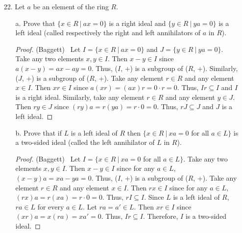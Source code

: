 \documentclass[10pt]{article}
\begin{document}
\begin{itemize}
\begin{itemize}
\item[b.] Prove that the intersection of an arbitrary nonempty collection of ideals is again an ideal
(do not assume the collection is countable).
\begin{proof} (Baggett) \ Let $\{ I_\lambda \}_{\lambda \in \Lambda}$ be an arbitrary nonempty collection
of ideals of a ring $R$. From Exercise 2.1.10(b), ($\bigcap_{\lambda \in \Lambda} I_\lambda$, +) is a subgroup 
of ($R$, +) since for every $\lambda \in \Lambda$, ($I_\lambda$, +) is a subgroup of ($R$, +). Take any element
$k \in \bigcap_{\lambda \in \Lambda} I_\lambda$. Then $k \in I_\lambda$ for every $\lambda \in \Lambda$. Since
$I_\lambda$ is an ideal, $rk \in I_\lambda$ for every $\lambda \in \Lambda$. Thus, 
$rk \in \bigcap_{\lambda \in \Lambda} I_\lambda$. Hence, $\bigcap_{\lambda \in \Lambda} I_\lambda$ is closed
under left multiplication by elements of $R$. Similarly, $\bigcap_{\lambda \in \Lambda} I_\lambda$ is closed
under right multiplication by elements of $R$. Thus, $\bigcap_{\lambda \in \Lambda} I_\lambda$ is an ideal of $R$.
\end{proof}
\end{itemize}


\item[22.] Let $a$ be an element of the ring $R$.
\begin{itemize}
\item[a.] Prove that $\{x \in R \ | \ ax = 0\}$ is a right ideal and $\{y \in R \ | \ ya = 0\}$ is a left ideal
(called respectively the right and left annihilators of $a$ in $R$).
\begin{proof} (Baggett) \ Let $I = \{x \in R \ | \ ax = 0\}$ and $J = \{y \in R \ | \ ya = 0\}$. Take any two elements
$x,y \in I$. Then $x - y \in I$ since $a(x - y) = ax - ay = 0$. Thus, ($I$, +) is a subgroup of ($R$, +).
Similarly, ($J$, +) is a subgroup of ($R$, +). Take any element $r \in R$ and any element $x \in I$. Then 
$xr \in I$ since $a(xr) = (ax)r = 0 \cdot r = 0$. Thus, $Ir \subseteq I$ and $I$ is a right ideal. Similarly,
take any element $r \in R$ and any element $y \in J$. Then $ry \in J$ since $(ry)a = r(ya) = r \cdot 0 = 0$. 
Thus, $rJ \subseteq J$ and $J$ is a left ideal.
\end{proof}

\item[b.] Prove that if $L$ is a left ideal of $R$ then $\{x \in R \ | \ xa = 0$ for all $a \in L\}$ is a two-sided
ideal (called the left annihilator of $L$ in $R$).
\begin{proof} (Baggett) \ Let $I = \{x \in R \ | \ xa = 0$ for all $a \in L\}$. Take any two elements $x,y \in I$. 
Then $x - y \in I$ since for any $a \in L$, $(x - y)a = xa - ya = 0$. Thus, ($I$, +) is a subgroup of ($R$, +).
Take any element $r \in R$ and any element $x \in I$. Then $rx \in I$ since for any $a \in L$, 
$(rx)a = r(xa) = r\cdot0 = 0$. Thus, $rI \subseteq I$. Since $L$ is a left ideal of $R$, $ra \in L$ for every
$a \in L$. Let $ra = a' \in L$. Then $xr \in I$ since $(xr)a = x(ra) = xa' = 0$. Thus, $Ir \subseteq I$. Therefore,
$I$ is a two-sided ideal.
\end{proof}
\end{itemize}


\end{itemize}
\end{document}
